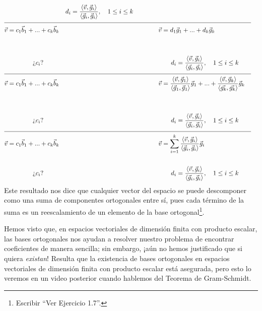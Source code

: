 \documentclass[12pt,dvipsnames]{article}
\numberwithin{equation}{section}
\begin{document}
\begin{align*}
    & &d_i = \frac{\langle \vec{v} ,\vec{g}_i \rangle}{\langle\vec{g}_i, \vec{g}_i\rangle}, \quad 1\le i\le k
    \\
    \cline{1-8}
    \vec{v}&= c_1\vec{b}_1 + ... + c_k\vec{b}_k& &\quad \quad \quad \quad \vec{v}= d_1\vec{g}_1 + ... + d_k\vec{g}_k& & & \\
    \\
    \\
           &\quad \quad \quad \quad \text{¿}c_i\text{?}& &\quad \quad \quad \quad \quad \quad d_i = \frac{\langle \vec{v} ,\vec{g}_i \rangle}{\langle\vec{g}_i, \vec{g}_i\rangle}, \quad 1\le i\le k& & &
    \\
    \cline{1-8}
    \vec{v}&= c_1\vec{b}_1 + ... + c_k\vec{b}_k& &\quad \quad \quad \quad \vec{v}= \frac{\langle \vec{v} , \vec{g}_1 \rangle}{\langle \vec{g}_1 , \vec{g}_1 \rangle}\vec{g}_1 + ... + \frac{\langle \vec{v} , \vec{g}_k \rangle}{\langle \vec{g_k} , \vec{g_k} \rangle}\vec{g}_k& & & \\
    \\
    \\
           &\quad \quad \quad \quad \text{¿}c_i\text{?}& &\quad \quad \quad \quad \quad \quad d_i = \frac{\langle \vec{v} ,\vec{g}_i \rangle}{\langle\vec{g}_i, \vec{g}_i\rangle}, \quad 1\le i\le k& & &
    \\
    \cline{1-8}
    \vec{v}&= c_1\vec{b}_1 + ... + c_k\vec{b}_k& &\quad \quad \quad \quad \vec{v}= \sum_{i=1}^k\frac{\langle \vec{v} , \vec{g}_i \rangle}{\langle \vec{g}_i , \vec{g}_i \rangle}\vec{g}_i & & &
    \\
    \\
           &\quad \quad \quad \quad \text{¿}c_i\text{?}& &\quad \quad \quad \quad \quad \quad d_i = \frac{\langle \vec{v} ,\vec{g}_i \rangle}{\langle\vec{g}_i, \vec{g}_i\rangle}, \quad 1\le i\le k& & &
\end{align*}
Este resultado nos dice que cualquier vector del espacio se puede descomponer como una suma de componentes ortogonales entre sí, pues cada término de la suma es un reescalamiento de un elemento de la base ortogonal\footnote{Escribir ``Ver Ejercicio 1.7''.}.

Hemos visto que, en espacios vectoriales de dimensión finita con producto escalar, las bases ortogonales nos ayudan a resolver nuestro problema de encontrar coeficientes de manera sencilla; sin embargo, ¡aún no hemos justificado que si quiera \emph{existan}! Resulta que la existencia de bases ortogonales en espacios vectoriales de dimensión finita con producto escalar está asegurada, pero esto lo veremos en un video posterior cuando hablemos del Teorema de Gram-Schmidt.
\end{document}
